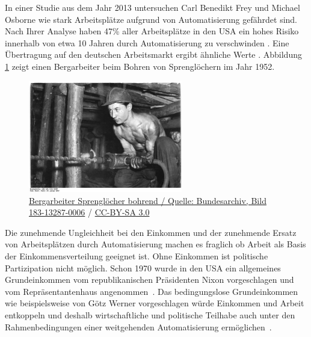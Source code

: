 \documentclass[paper=a4,oneside,abstract]{scrartcl}
\begin{document}
In einer Studie aus dem Jahr 2013 untersuchen Carl Benedikt Frey und Michael Osborne wie stark Arbeitsplätze aufgrund von Automatisierung gefährdet sind. Nach Ihrer Analyse haben 47\% aller Arbeitsplätze in den USA ein hohes Risiko innerhalb von etwa 10 Jahren durch Automatisierung zu verschwinden \cite{frey17}\cite{frey13}. Eine Übertragung auf den deutschen Arbeitsmarkt ergibt ähnliche Werte \cite{bonin15}. Abbildung \ref{fig:bergmann} zeigt einen Bergarbeiter beim Bohren von Sprenglöchern im Jahr 1952.
\begin{figure}[!htb]
\begin{center}
\includegraphics[width=0.6\textwidth]{bergmann}
\end{center}
\caption{\href{{https://commons.wikimedia.org/wiki/File:Bundesarchiv_Bild_183-13287-0006,_Bergarbeiter_Sprengl\%C3\%B6cher_bohrend.jpg}}{Bergarbeiter Sprenglöcher bohrend / Quelle: Bundesarchiv, Bild 183-13287-0006} / \href{https://creativecommons.org/licenses/by-sa/3.0/de/deed.en}{CC-BY-SA 3.0}}
\label{fig:bergmann}
\end{figure}
Die zunehmende Ungleichheit bei den Einkommen und der zunehmende Ersatz von Arbeitsplätzen durch Automatisierung machen es fraglich ob Arbeit als Basis der Einkommensverteilung geeignet ist. Ohne Einkommen ist politische Partizipation nicht möglich. Schon 1970 wurde in den USA ein allgemeines Grundeinkommen vom republikanischen Präsidenten Nixon vorgeschlagen und vom Repräsentantenhaus angenommen~\cite{weaver70}. Das bedingungslose Grundeinkommen wie beispielsweise von Götz Werner vorgeschlagen würde Einkommen und Arbeit entkoppeln und deshalb wirtschaftliche und politische Teilhabe auch unter den Rahmenbedingungen einer weitgehenden Automatisierung ermöglichen~\cite{werner08}.

\printbibliography
\end{document}
